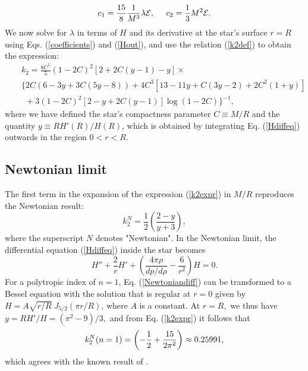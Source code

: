 \documentclass[12pt,preprint]{aastex}
\begin{document}
{\begin{equation} c_1 = {15 \over 8}{1 \over M^3} \lambda {\cal{E}},
{\;}{\;}{\;}{\;}{\;}c_2 = {1 \over 3} M^2
{\cal{E}}.\label{coefficients}\end{equation} We now solve for
$\lambda$ in terms of $H$ and its derivative at the star's surface
$r=R$ using Eqs. (\ref{coefficients}) and (\ref{Hout}), and use the
relation (\ref{k2def}) to obtain the expression:
 \begin{eqnarray} \label{k2expr}
&& k_2 = \frac{8C^5}{5}\left(1-2C\right)^2
\left[2+2C\left(y-1\right)-y\right]\times\\
&&\bigg\{2C\left(6-3 y+3 C(5y-8)\right)+4C^3\left[13-11y+C(3 y-2)+2
C^2(1+y)\right] \nonumber\\
&& ~ ~
+3(1-2C)^2\left[2-y+2C(y-1)\right]\log\left(1-2C\right)\bigg\}^{-1},\nonumber
\end{eqnarray} where we have defined the star's compactness parameter $C\equiv
M/R$ and the quantity $y\equiv RH{'}(R)/ H(R)$, which is obtained by
integrating Eq. (\ref{Hdiffeq}) outwards in the region $0<r<R$.



\subsection{Newtonian limit}

The first term in the expansion of the expression (\ref{k2expr}) in
$M/R$ reproduces the Newtonian result:
\begin{equation} k_2^N=\frac{1}{2 }\left(\frac{2- y}{ y + 3
}\right),\label{newtk2}\end{equation} where the superscript $N$
denotes "Newtonian". In the Newtonian limit, the differential
equation (\ref{Hdiffeq}) inside the star becomes \begin{equation}
H''+\frac{2}{r}H'+\left(\frac{4\pi\rho}{dp/d\rho}-\frac{6}{r^2}\right)H=0.\label{Newtoniandiff}
\end{equation} For a polytropic index of $n=1$, Eq. (\ref{Newtoniandiff}) can
be transformed to a Bessel equation with the solution that is
regular at $r=0$ given by $ H=A \sqrt{{r/R}} ~ J_{5/2}(\pi r/ R)$,
where $A$ is a constant. At $r=R,$ we thus have $y=RH{'}/ H =(\pi^2
- 9 )/3,$ and from Eq. (\ref{k2expr}) it follows that
\begin{equation} k_2^N(n=1)=\left( -{1 \over 2} + {15 \over 2 \pi^2}\right) \approx
0.25991,\end{equation} which agrees with the known result of
\citet{bo}.

}
\end{document}
